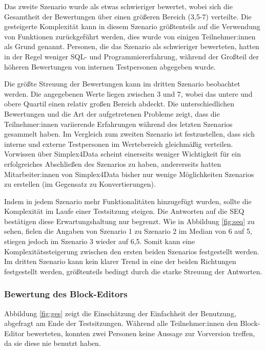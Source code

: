 Das zweite Szenario wurde als etwas schwieriger bewertet, wobei sich die Gesamtheit der Bewertungen über einen größeren Bereich (3,5-7) verteilte. Die gesteigerte Komplexität kann in diesem Szenario größtenteils auf die Verwendung von Funktionen zurückgeführt werden, dies wurde von einigen Teilnehmer:innen als Grund genannt. Personen, die das Szenario als schwieriger bewerteten, hatten in der Regel weniger \ac{SQL}- und Programmiererfahrung, während der Großteil der höheren Bewertungen von internen Testpersonen abgegeben wurde.

Die größte Streuung der Bewertungen kann im dritten Szenario beobachtet werden. Die angegebenen Werte liegen zwischen 3 und 7, wobei das untere und obere Quartil einen relativ großen Bereich abdeckt. Die unterschiedlichen Bewertungen und die Art der aufgetretenen Probleme zeigt, dass die Teilnehmer:innen variierende Erfahrungen während des letzten Szenarios gesammelt haben. Im Vergleich zum zweiten Szenario ist festzustellen, dass sich interne und externe Testpersonen im Wertebereich gleichmäßig verteilen. Vorwissen über Simplex4Data scheint einerseits weniger Wichtigkeit für ein erfolgreiches Abschließen des Szenarios zu haben, andererseits hatten Mitarbeiter:innen von Simplex4Data bisher nur wenige Möglichkeiten Szenarios zu erstellen (im Gegensatz zu Konvertierungen).

Indem in jedem Szenario mehr Funktionalitäten hinzugefügt wurden, sollte die Komplexität im Laufe einer Testsitzung steigen. Die Antworten auf die \ac{SEQ} bestätigen diese Erwartungshaltung nur begrenzt. Wie in Abbildung \ref{fig:seq} zu sehen, fielen die Angaben von Szenario 1 zu Szenario 2 im Median von 6 auf 5, stiegen jedoch im Szenario 3 wieder auf 6,5. Somit kann eine Komplexitätssteigerung zwischen den ersten beiden Szenarios festgestellt werden. Im dritten Szenario kann kein klarer Trend in eine der beiden Richtungen festgestellt werden, größtenteils bedingt durch die starke Streuung der Antworten.

\subsubsection{Bewertung des Block-Editors}


Abbildung \ref{fig:ges} zeigt die Einschätzung der Einfachheit der Benutzung, abgefragt am Ende der Testsitzungen. Während alle Teilnehmer:innen den Block-Editor bewerteten, konnten zwei Personen keine Aussage zur Vorversion treffen, da sie diese nie benutzt haben.

